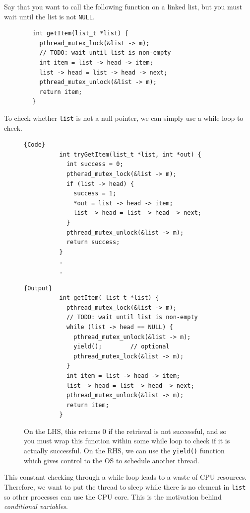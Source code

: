 \documentclass{article}
\newcounter{example}[section]
\begin{document}
    \begin{example}
      \label{ex:condition-checks-with-vanilla-while-loops}
      Say that you want to call the following function on a linked list, but you must wait until the list is not \texttt{NULL}. 
      \begin{lstlisting}
        int getItem(list_t *list) {
          pthread_mutex_lock(&list -> m); 
          // TODO: wait until list is non-empty
          int item = list -> head -> item; 
          list -> head = list -> head -> next; 
          pthread_mutex_unlock(&list -> m);  
          return item; 
        }
      \end{lstlisting}

      To check whether \texttt{list} is not a null pointer, we can simply use a while loop to check. 

      \begin{figure}[H]
        \centering 
        \noindent\begin{minipage}{.5\textwidth}
        \begin{lstlisting}[]{Code}
          int tryGetItem(list_t *list, int *out) {
            int success = 0; 
            ptherad_mutex_lock(&list -> m); 
            if (list -> head) {
              success = 1; 
              *out = list -> head -> item;
              list -> head = list -> head -> next; 
            }
            pthread_mutex_unlock(&list -> m); 
            return success; 
          }
          .
          .
        \end{lstlisting}
        \end{minipage}
        \hfill
        \begin{minipage}{.49\textwidth}
        \begin{lstlisting}[]{Output}
          int getItem( list_t *list) {
            pthread_mutex_lock(&list -> m); 
            // TODO: wait until list is non-empty 
            while (list -> head == NULL) {
              pthread_mutex_unlock(&list -> m); 
              yield();        // optional 
              pthread_mutex_lock(&list -> m); 
            }
            int item = list -> head -> item; 
            list -> head = list -> head -> next; 
            pthread_mutex_unlock(&list -> m);  
            return item; 
          }
        \end{lstlisting}
        \end{minipage}
        \caption{On the LHS, this returns $0$ if the retrieval is not successful, and so you must wrap this function within some while loop to check if it is actually successful. On the RHS, we can use the \texttt{yield()} function which gives control to the OS to schedule another thread. }
        \label{fig:cpu_waste}
      \end{figure}

      This constant checking through a while loop leads to a waste of CPU resources. Therefore, we want to put the thread to sleep while there is no element in \texttt{list} so other processes can use the CPU core. This is the motivation behind \textit{conditional variables}. 
    \end{example}
\end{document}
